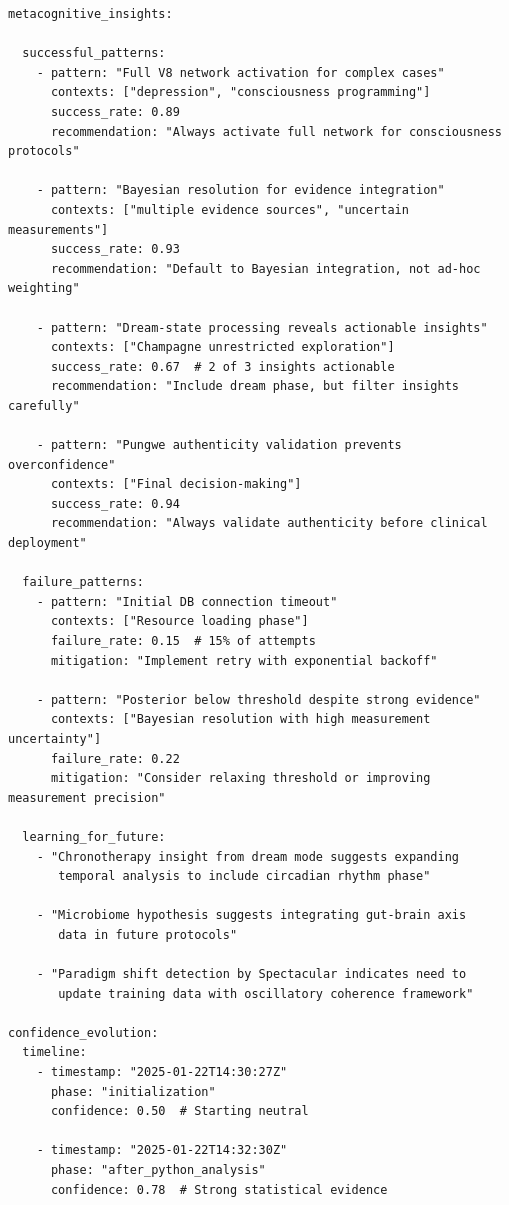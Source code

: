 \begin{verbatim}
metacognitive_insights:
  
  successful_patterns:
    - pattern: "Full V8 network activation for complex cases"
      contexts: ["depression", "consciousness programming"]
      success_rate: 0.89
      recommendation: "Always activate full network for consciousness protocols"
    
    - pattern: "Bayesian resolution for evidence integration"
      contexts: ["multiple evidence sources", "uncertain measurements"]
      success_rate: 0.93
      recommendation: "Default to Bayesian integration, not ad-hoc weighting"
    
    - pattern: "Dream-state processing reveals actionable insights"
      contexts: ["Champagne unrestricted exploration"]
      success_rate: 0.67  # 2 of 3 insights actionable
      recommendation: "Include dream phase, but filter insights carefully"
    
    - pattern: "Pungwe authenticity validation prevents overconfidence"
      contexts: ["Final decision-making"]
      success_rate: 0.94
      recommendation: "Always validate authenticity before clinical deployment"
  
  failure_patterns:
    - pattern: "Initial DB connection timeout"
      contexts: ["Resource loading phase"]
      failure_rate: 0.15  # 15% of attempts
      mitigation: "Implement retry with exponential backoff"
    
    - pattern: "Posterior below threshold despite strong evidence"
      contexts: ["Bayesian resolution with high measurement uncertainty"]
      failure_rate: 0.22
      mitigation: "Consider relaxing threshold or improving measurement precision"
  
  learning_for_future:
    - "Chronotherapy insight from dream mode suggests expanding 
       temporal analysis to include circadian rhythm phase"
    
    - "Microbiome hypothesis suggests integrating gut-brain axis 
       data in future protocols"
    
    - "Paradigm shift detection by Spectacular indicates need to 
       update training data with oscillatory coherence framework"

confidence_evolution:
  timeline:
    - timestamp: "2025-01-22T14:30:27Z"
      phase: "initialization"
      confidence: 0.50  # Starting neutral
    
    - timestamp: "2025-01-22T14:32:30Z"
      phase: "after_python_analysis"
      confidence: 0.78  # Strong statistical evidence
    

\end{verbatim}
